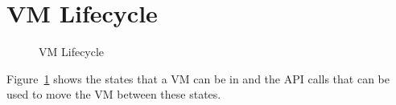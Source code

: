 %
%
%
%

\section{VM Lifecycle}

\begin{figure}
\centering
{}
\caption{VM Lifecycle}
\label{fig-vm-lifecycle}
\end{figure}

Figure~\ref{fig-vm-lifecycle} shows the states that a VM can be in
and the API calls that can be used to move the VM between these states.
